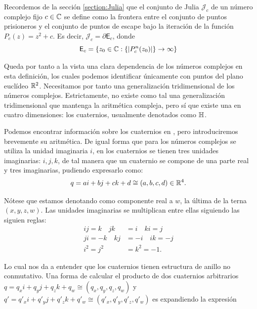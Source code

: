 Recordemos de la sección \ref{section:Julia} que el conjunto de Julia $\mathcal{J}_c$ de un número complejo fijo $c\in\mathbb{C}$ se define como la frontera entre el conjunto de puntos prisioneros y el conjunto de puntos de escape bajo la iteración de la función $P_{c}(z)=z^2+c$. Es decir, $\mathcal{J}_c = \partial \mathsf{E}_c$, donde
\begin{equation}
    \mathsf{E}_c = \{z_0\in\mathbb{C}: \{|P_c^n(z_0)|\}\rightarrow \infty \}
\end{equation}

Queda por tanto a la vista una clara dependencia de los números complejos en esta definición, los cuales podemos identificar únicamente con puntos del plano euclídeo $\mathbb{R}^2$. Necesitamos por tanto una generalización tridimensional de los números complejos. Estrictamente, no existe como tal una generalización tridimensional que mantenga la aritmética compleja, pero sí que existe una en cuatro dimensiones: los cuaternios, usualmente denotados como $\mathbb{H}$.

Podemos encontrar información sobre los cuaternios en \cite{quaternions}, pero introduciremos brevemente su aritmética. De igual forma que para los números complejos se utiliza la unidad imaginaria $i$, en los cuaternios se tienen tres unidades imaginarias: $i,j,k$, de tal manera que un cuaternio se compone de una parte real y tres imaginarias, pudiendo expresarlo como:
\begin{equation}
    q = a i + b j + c k + d \cong (a,b,c,d)\in \mathbb{R}^4.
\end{equation}

Nótese que estamos denotando como componente real a $w$, la última de la terna $(x,y,z,w)$. Las unidades imaginarias se multiplican entre ellas siguiendo las siguien reglas:
\begin{equation}
    \label{eq:relaciones-cuaternios}
    \begin{split}
        ij = k \quad jk &= i \quad ki = j \\
        ji = -k \quad kj &= -i \quad ik = -j \\
        i^2 = j^2 &= k^2 = -1. 
    \end{split}
\end{equation}

Lo cual nos da a entender que los cuaternios tienen estructura de anillo no conmutativo. Una forma de calcular el producto de dos cuaternios arbitrarios $q = q_x i + q_y j + q_z k + q_w\cong (q_x,q_y,q_z,q_w)$ y $q' = q'_x i + q'_y j + q'_z  k + q'_w\cong (q'_x,q'_y,q'_z,q'_w)$ es expandiendo la expresión

